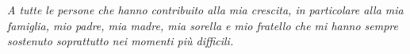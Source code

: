 \thispagestyle{empty}
\begin{flushright}
\null{}
\textit{A tutte le persone che hanno contribuito alla mia crescita, in particolare alla mia famiglia, mio padre, mia madre, mia sorella e mio fratello che mi hanno sempre sostenuto soprattutto nei momenti pi\`u difficili.}
\null
\end{flushright}